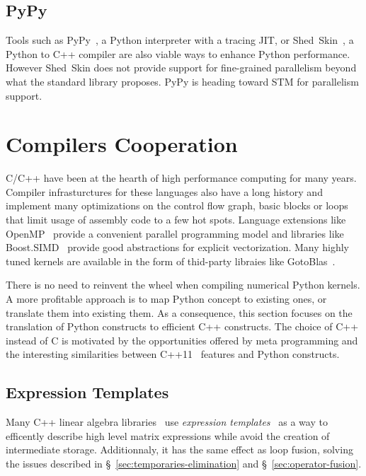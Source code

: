 \documentclass[10pt, preprint]{sigplanconf}
\begin{document}
\subsection{PyPy}
\cite{pypy2009}

Tools such as PyPy~\cite{pypy2009}, a Python interpreter with a tracing JIT, or
Shed~Skin~\cite{shedskin2006}, a Python to C++ compiler are also viable ways to
enhance Python performance. However Shed~Skin does not provide support for
fine-grained parallelism beyond what the standard library proposes. PyPy is
heading toward STM for parallelism support.

\section{Compilers Cooperation}
\label{sec:pythran}

C/C++ have been at the hearth of high performance computing for many years.
Compiler infrasturctures for these languages also have a long history and
implement many optimizations on the control flow graph, basic blocks or
loops~\cite{Aho2006} that limit usage of assembly code to a few hot spots.
Language extensions like OpenMP~\cite{openmp4} provide a convenient parallel
programming model and libraries like Boost.SIMD~\cite{esterie2012boost} provide 
good abstractions for explicit vectorization. Many highly tuned kernels are
available in the form of thid-party libraies like GotoBlas~\cite{gotoblas2008}.

There is no need to reinvent the wheel when compiling numerical Python kernels.
A more profitable approach is to map Python concept to existing ones, or
translate them into existing them. As a consequence, this section focuses on
the translation of Python constructs to efficient C++ constructs. The choice of
C++ instead of C is motivated by the opportunities offered by meta programming
and the interesting similarities between C++11~\cite{isocxx11} features and
Python constructs.

\subsection{Expression Templates}

Many C++ linear algebra libraries~\cite{eigen,ublas} use \emph{expression
templates}~\cite{expression_templates, et2012} as a way to efficently describe high
level matrix expressions while avoid the creation of intermediate storage.
Additionnaly, it has the same effect as loop fusion, solving the issues
described in \S~\ref{sec:temporaries-elimination} and
\S~\ref{sec:operator-fusion}.
\end{document}
